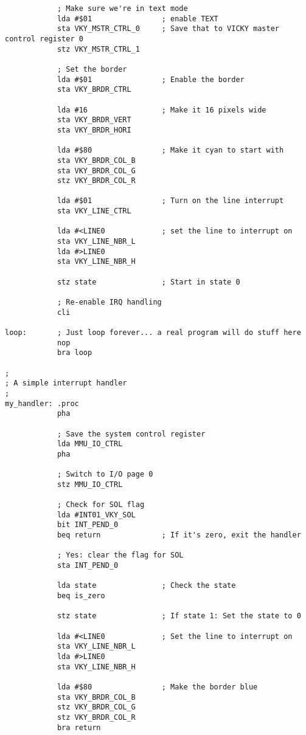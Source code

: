 \begin{verbatim}
            ; Make sure we're in text mode
            lda #$01                ; enable TEXT
            sta VKY_MSTR_CTRL_0     ; Save that to VICKY master control register 0
            stz VKY_MSTR_CTRL_1

            ; Set the border
            lda #$01                ; Enable the border
            sta VKY_BRDR_CTRL

            lda #16                 ; Make it 16 pixels wide
            sta VKY_BRDR_VERT
            sta VKY_BRDR_HORI

            lda #$80                ; Make it cyan to start with
            sta VKY_BRDR_COL_B
            sta VKY_BRDR_COL_G
            stz VKY_BRDR_COL_R

            lda #$01                ; Turn on the line interrupt
            sta VKY_LINE_CTRL

            lda #<LINE0             ; set the line to interrupt on
            sta VKY_LINE_NBR_L
            lda #>LINE0
            sta VKY_LINE_NBR_H

            stz state               ; Start in state 0

            ; Re-enable IRQ handling
            cli

loop:       ; Just loop forever... a real program will do stuff here
            nop
            bra loop

;
; A simple interrupt handler
;
my_handler: .proc
            pha

            ; Save the system control register
            lda MMU_IO_CTRL
            pha

            ; Switch to I/O page 0
            stz MMU_IO_CTRL

            ; Check for SOL flag
            lda #INT01_VKY_SOL
            bit INT_PEND_0
            beq return              ; If it's zero, exit the handler

            ; Yes: clear the flag for SOL
            sta INT_PEND_0

            lda state               ; Check the state
            beq is_zero

            stz state               ; If state 1: Set the state to 0

            lda #<LINE0             ; Set the line to interrupt on
            sta VKY_LINE_NBR_L
            lda #>LINE0
            sta VKY_LINE_NBR_H

            lda #$80                ; Make the border blue
            sta VKY_BRDR_COL_B
            stz VKY_BRDR_COL_G
            stz VKY_BRDR_COL_R
            bra return


\end{verbatim}
